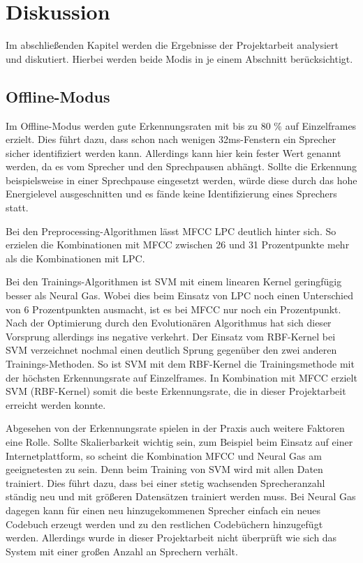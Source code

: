 \chapter{Diskussion}
\label{cha:diskussion}
Im abschließenden Kapitel werden die Ergebnisse der Projektarbeit analysiert und diskutiert. Hierbei werden beide Modis in je einem Abschnitt berücksichtigt.

\section{Offline-Modus}
Im Offline-Modus werden gute Erkennungsraten mit bis zu 80 \% auf Einzelframes erzielt. Dies führt dazu, dass schon nach wenigen 32ms-Fenstern ein Sprecher sicher identifiziert werden kann. Allerdings kann hier kein fester Wert genannt werden, da es vom Sprecher und den Sprechpausen abhängt. Sollte die Erkennung beispielsweise in einer Sprechpause eingesetzt werden, würde diese durch das hohe Energielevel ausgeschnitten und es fände keine Identifizierung eines Sprechers statt.

Bei den Preprocessing-Algorithmen lässt MFCC LPC deutlich hinter sich. So erzielen die Kombinationen mit MFCC zwischen 26 und 31 Prozentpunkte mehr als die Kombinationen mit LPC.

Bei den Trainings-Algorithmen ist SVM mit einem linearen Kernel geringfügig besser als Neural Gas. Wobei dies beim Einsatz von LPC noch einen Unterschied von 6 Prozentpunkten ausmacht, ist es bei MFCC nur noch ein Prozentpunkt. Nach der Optimierung durch den Evolutionären Algorithmus hat sich dieser Vorsprung allerdings ins negative verkehrt. Der Einsatz vom RBF-Kernel bei SVM verzeichnet nochmal einen deutlich Sprung gegenüber den zwei anderen Trainings-Methoden. So ist SVM mit dem RBF-Kernel die Trainingsmethode mit der höchsten Erkennungsrate auf Einzelframes. In Kombination mit MFCC erzielt SVM (RBF-Kernel) somit die beste Erkennungsrate, die in dieser Projektarbeit erreicht werden konnte.

Abgesehen von der Erkennungsrate spielen in der Praxis auch weitere Faktoren eine Rolle. Sollte Skalierbarkeit wichtig sein, zum Beispiel beim Einsatz auf einer Internetplattform, so scheint die Kombination MFCC und Neural Gas am geeignetesten zu sein. Denn beim Training von SVM wird mit allen Daten trainiert. Dies führt dazu, dass bei einer stetig wachsenden Sprecheranzahl ständig neu und mit größeren Datensätzen trainiert werden muss. Bei Neural Gas dagegen kann für einen neu hinzugekommenen Sprecher einfach ein neues Codebuch erzeugt werden und zu den restlichen Codebüchern hinzugefügt werden. Allerdings wurde in dieser Projektarbeit nicht überprüft wie sich das System mit einer großen Anzahl an Sprechern verhält.

